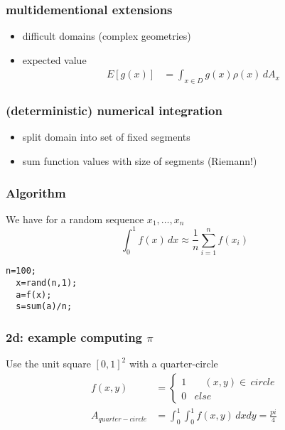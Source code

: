 \documentclass[10pt]{beamer}
\begin{document}
\begin{frame}
\frametitle{multidementional extensions}
\begin{itemize}
  \item difficult domains (complex geometries)
  \item expected value
  \begin{align*}
  E[g(x)] & = \int_{x\in D} g(x)\rho(x)\,dA_x
  \end{align*}
\end{itemize}
\end{frame}
\begin{frame}
\frametitle{(deterministic) numerical integration}
\begin{itemize}
  \item  split domain into set of fixed segments
  \item sum function values with size of segments (Riemann!)
\end{itemize}
\begin{center}
\end{center}
\end{frame}
\begin{frame}[fragile]
\frametitle{Algorithm}
We have for a random sequence $x_1,\dots,x_n$
\begin{equation*}
  \int_0^1 f(x)\,dx \approx \frac{1}{n} \sum_{i=1}^{n} f(x_i)  
\end{equation*}

\begin{lstlisting}[mathescape]
  n=100;
  x=rand(n,1);
  a=f(x);
  s=sum(a)/n;
\end{lstlisting}
\end{frame}
\begin{frame}
\frametitle{2d: example computing $\pi$}
Use the unit square $[0,1]^2$ with a quarter-circle
\begin{align*}
  f(x,y) & = 
\begin{cases}
1 & \quad (x,y)\in \, circle\\
0 & else
\end{cases}\\
  A_{quarter-circle} &= \int_0^1\int_0^1 f(x,y)\,dxdy = \frac{pi}{4}
\end{align*}
\begin{center}
\end{center}
\end{frame}
\end{document}
